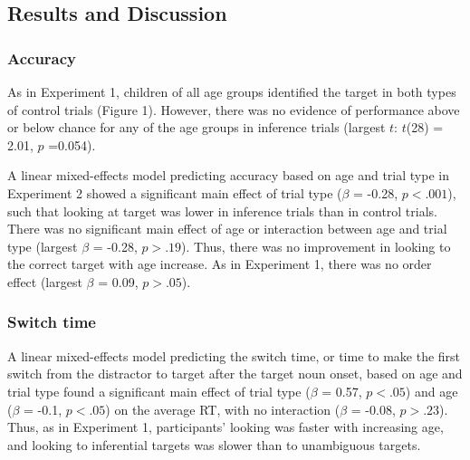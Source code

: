 \documentclass[a4paper,man,apacite,floatsintext]{apa6}
\begin{document}
\subsection{Results and Discussion}\label{results-and-discussion}

\subsubsection{Accuracy}\label{accuracy-1}

As in Experiment 1, children of all age groups identified the target in
both types of control trials (Figure 1). However, there was no evidence
of performance above or below chance for any of the age groups in
inference trials (largest \(t\): \(t\)(28) = 2.01, \(p\) =0.054).

A linear mixed-effects model predicting accuracy based on age and trial
type in Experiment 2 showed a significant main effect of trial type
(\(\beta\) = -0.28, \(p <.001\)), such that looking at target was lower
in inference trials than in control trials. There was no significant
main effect of age or interaction between age and trial type (largest
\(\beta\) = -0.28, \(p >.19\)). Thus, there was no improvement in
looking to the correct target with age increase. As in Experiment 1,
there was no order effect (largest \(\beta\) = 0.09, \(p >.05\)).

\subsubsection{Switch time}\label{switch-time-1}

A linear mixed-effects model predicting the switch time, or time to make
the first switch from the distractor to target after the target noun
onset, based on age and trial type found a significant main effect of
trial type (\(\beta\) = 0.57, \(p <.05\)) and age (\(\beta\) = -0.1,
\(p <.05\)) on the average RT, with no interaction (\(\beta\) = -0.08,
\(p >.23\)). Thus, as in Experiment 1, participants' looking was faster
with increasing age, and looking to inferential targets was slower than
to unambiguous targets.
\end{document}
